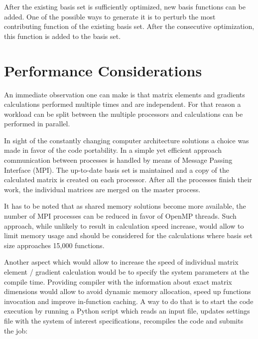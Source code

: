 After the existing basis set is sufficiently optimized, 
new basis functions can be added. One of the possible 
ways to generate it is to perturb the most contributing
function of the existing basis set. After the consecutive
optimization, this function is added to the basis set.

\section{Performance Considerations}

An immediate observation one can make is that matrix elements
and gradients calculations performed multiple times and are
independent. For that reason a workload can be split between 
the multiple processors and calculations can be performed 
in parallel. 

In sight of the constantly changing computer architecture 
solutions a choice was made in favor of the code portability.
In a simple yet efficient approach communication between
processes is handled by means of Message Passing Interface (MPI).
The up-to-date basis set is maintained and
a copy of the calculated matrix is created on each processor.
After all the processes finish their work, 
the individual matrices are merged
on the master process.

It has to be noted that as shared memory solutions become more 
available, the number of MPI processes can be reduced in favor 
of OpenMP threads. Such approach, while unlikely to result 
in calculation speed increase, would allow to limit memory 
usage and should be considered for the calculations where
basis set size approaches 15,000 functions.

Another aspect which would allow to increase the speed of individual
matrix element / gradient calculation would be to specify the system
parameters at the compile time. Providing compiler with the information
about exact matrix dimensions would allow to avoid dynamic memory
allocation, speed up functions invocation and improve in-function
caching. A way to do that is to start the code execution by 
running a Python script which reads an input file, updates 
settings file with the system of interest specifications,
recompiles the code and submits the job:







